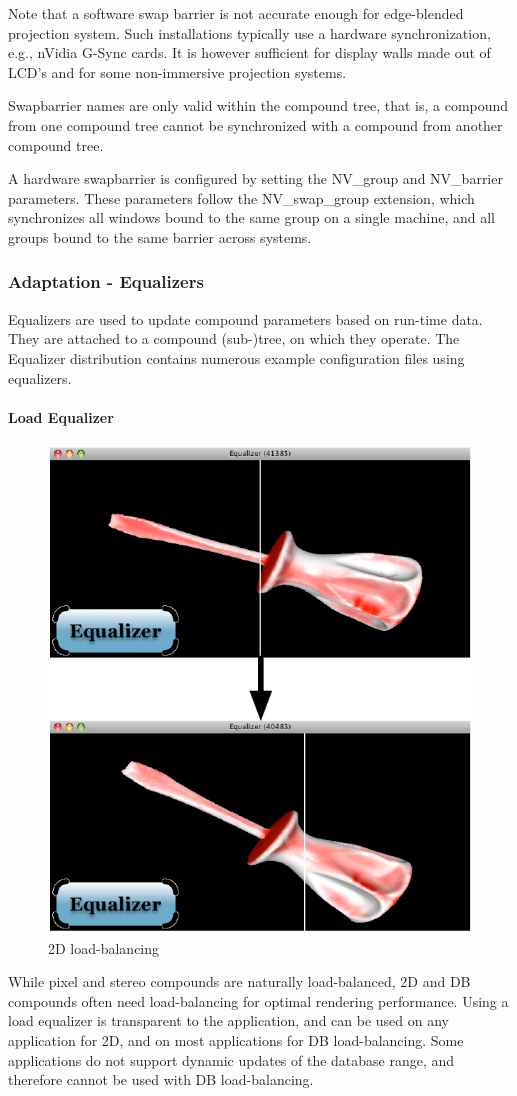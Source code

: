 \documentclass[10pt,a4]{scrartcl}
\begin{document}
Note that a software swap barrier is not accurate enough for
edge-blended projection system. Such installations typically use a
hardware synchronization, e.g., nVidia G-Sync cards. It is however
sufficient for display walls made out of LCD's and for some
non-immersive projection systems.

Swapbarrier names are only valid within the compound tree, that is, a
compound from one compound tree cannot be synchronized with a compound
from another compound tree.

A hardware swapbarrier is configured by setting the \textsf{NV\_group}
and \textsf{NV\_barrier} parameters. These parameters follow the
\textsf{NV\_swap\_group} extension, which synchronizes all windows bound
to the same group on a single machine, and all groups bound to the same
barrier across systems.

\subsubsection{\label{sEqualizers}Adaptation - Equalizers}

Equalizers are used to update compound parameters based on run-time
data. They are attached to a compound (sub-)tree, on which they
operate. The Equalizer distribution contains numerous example
configuration files using equalizers.

\paragraph{Load Equalizer}
\vspace{-2ex}\begin{figure}
  \includegraphics[width=.382\textwidth]{images/lb.pdf}
  {\caption{\label{fLoadBalancing}\small 2D load-balancing}}
\end{figure}
While pixel and stereo compounds are naturally load-balanced, 2D and DB
compounds often need load-balancing for optimal rendering
performance. Using a load equalizer is transparent to the application,
and can be used on any application for 2D, and on most applications for
DB load-balancing. Some applications do not support dynamic updates of
the database range, and therefore cannot be used with DB load-balancing.
\end{document}

